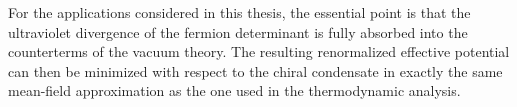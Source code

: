 For the applications considered in this thesis, the essential point
is that the ultraviolet divergence of the fermion determinant is fully
absorbed into the counterterms of the vacuum theory. The resulting
renormalized effective potential can then be minimized with respect to
the chiral condensate in exactly the same mean-field approximation as
the one used in the thermodynamic analysis.
